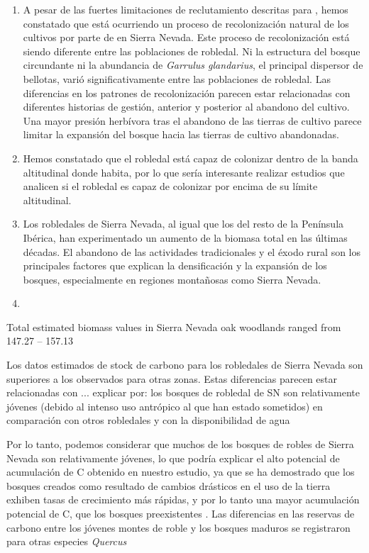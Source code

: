 \begin{enumerate}
    \item A pesar de las fuertes limitaciones de reclutamiento descritas para \Qp, hemos constatado que está ocurriendo un proceso de recolonización natural de los cultivos por parte de \Qp en Sierra Nevada. Este proceso de recolonización está siendo diferente entre las poblaciones de robledal. Ni la estructura del bosque circundante ni la abundancia de \emph{Garrulus glandarius}, el principal dispersor de bellotas,  varió significativamente entre las poblaciones de robledal. Las diferencias en los patrones de recolonización parecen estar relacionadas con diferentes historias de gestión, anterior y posterior al abandono del cultivo. Una mayor presión herbívora tras el abandono de las tierras de cultivo parece limitar la expansión del bosque hacia las tierras de cultivo abandonadas. 
    
    \item Hemos constatado que el robledal está capaz de colonizar dentro de la banda altitudinal donde habita, por lo que sería interesante realizar estudios que analicen si el robledal es capaz de colonizar por encima de su límite altitudinal. 
    
    \item Los robledales de Sierra Nevada, al igual que los del resto de la Península Ibérica, han experimentado un aumento de la biomasa total en las últimas décadas. El abandono de las actividades tradicionales y el éxodo rural son los principales factores que explican la densificación y la expansión de los bosques, especialmente en regiones montañosas como Sierra Nevada. 
    
    \item 


\end{enumerate}


Total estimated biomass values in Sierra Nevada oak woodlands ranged from 147.27 -- 157.13 \mgha

Los datos estimados de stock de carbono para los robledales de Sierra Nevada son superiores a los observados para otras zonas. Estas diferencias parecen estar relacionadas con ... explicar por: los bosques de robledal de SN son relativamente jóvenes (debido al intenso uso antrópico al que han estado sometidos) en comparación con otros robledales  y con la disponibilidad de agua 



Por lo tanto, podemos considerar que muchos de los bosques de robles de Sierra Nevada son relativamente jóvenes, lo que podría explicar el alto potencial de acumulación de C obtenido en nuestro estudio, ya que se ha demostrado que los bosques creados como resultado de cambios drásticos en el uso de la tierra exhiben tasas de crecimiento más rápidas, y por lo tanto una mayor acumulación potencial de C, que los bosques preexistentes . Las diferencias en las reservas de carbono entre los jóvenes montes de roble y los bosques maduros se registraron para otras especies \emph{Quercus}

